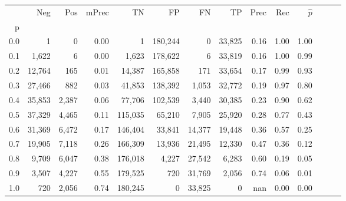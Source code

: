 \begin{tabular}{rrrrrrrrrrrrrr}
\toprule
{} &     Neg &    Pos & mPrec &       TN &       FP &      FN &      TP &  Prec &   Rec & $\hat{p}$ \\
p   &         &        &       &          &          &         &         &       &       &           \\
\midrule
0.0 &       1 &      0 &  0.00 &        1 &  180,244 &       0 &  33,825 &  0.16 &  1.00 &      1.00 \\
0.1 &   1,622 &      6 &  0.00 &    1,623 &  178,622 &       6 &  33,819 &  0.16 &  1.00 &      0.99 \\
0.2 &  12,764 &    165 &  0.01 &   14,387 &  165,858 &     171 &  33,654 &  0.17 &  0.99 &      0.93 \\
0.3 &  27,466 &    882 &  0.03 &   41,853 &  138,392 &   1,053 &  32,772 &  0.19 &  0.97 &      0.80 \\
0.4 &  35,853 &  2,387 &  0.06 &   77,706 &  102,539 &   3,440 &  30,385 &  0.23 &  0.90 &      0.62 \\
0.5 &  37,329 &  4,465 &  0.11 &  115,035 &   65,210 &   7,905 &  25,920 &  0.28 &  0.77 &      0.43 \\
0.6 &  31,369 &  6,472 &  0.17 &  146,404 &   33,841 &  14,377 &  19,448 &  0.36 &  0.57 &      0.25 \\
0.7 &  19,905 &  7,118 &  0.26 &  166,309 &   13,936 &  21,495 &  12,330 &  0.47 &  0.36 &      0.12 \\
0.8 &   9,709 &  6,047 &  0.38 &  176,018 &    4,227 &  27,542 &   6,283 &  0.60 &  0.19 &      0.05 \\
0.9 &   3,507 &  4,227 &  0.55 &  179,525 &      720 &  31,769 &   2,056 &  0.74 &  0.06 &      0.01 \\
1.0 &     720 &  2,056 &  0.74 &  180,245 &        0 &  33,825 &       0 &   nan &  0.00 &      0.00 \\
\bottomrule
\end{tabular}

